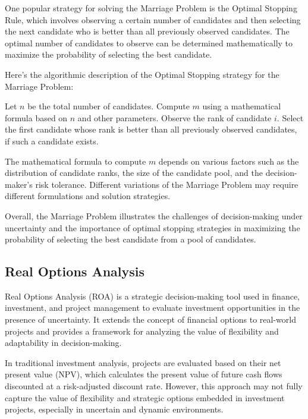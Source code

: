 \documentclass[12pt]{book} %
\begin{document}
One popular strategy for solving the Marriage Problem is the Optimal Stopping Rule, which involves observing a certain number of candidates and then selecting the next candidate who is better than all previously observed candidates. The optimal number of candidates to observe can be determined mathematically to maximize the probability of selecting the best candidate.

Here's the algorithmic description of the Optimal Stopping strategy for the Marriage Problem:
\FloatBarrier
\begin{algorithm}
\caption{Optimal Stopping Algorithm for Marriage Problem}
\begin{algorithmic}[1]
\State Let \(n\) be the total number of candidates.
\State Compute \(m\) using a mathematical formula based on \(n\) and other parameters.
    \State Observe the rank of candidate \(i\).
\EndFor
\State Select the first candidate whose rank is better than all previously observed candidates, if such a candidate exists.
\end{algorithmic}
\end{algorithm}
\FloatBarrier
The mathematical formula to compute \(m\) depends on various factors such as the distribution of candidate ranks, the size of the candidate pool, and the decision-maker's risk tolerance. Different variations of the Marriage Problem may require different formulations and solution strategies.

Overall, the Marriage Problem illustrates the challenges of decision-making under uncertainty and the importance of optimal stopping strategies in maximizing the probability of selecting the best candidate from a pool of candidates.


\subsection{Real Options Analysis}
Real Options Analysis (ROA) is a strategic decision-making tool used in finance, investment, and project management to evaluate investment opportunities in the presence of uncertainty. It extends the concept of financial options to real-world projects and provides a framework for analyzing the value of flexibility and adaptability in decision-making.

In traditional investment analysis, projects are evaluated based on their net present value (NPV), which calculates the present value of future cash flows discounted at a risk-adjusted discount rate. However, this approach may not fully capture the value of flexibility and strategic options embedded in investment projects, especially in uncertain and dynamic environments.
\end{document}

